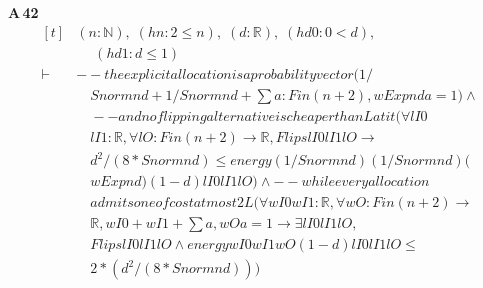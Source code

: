 \noindent\textbf{A\,42}\quad{}
{\footnotesize\[ \begin{aligned}[t]
&(\mathit{n} : \mathbb{N} ),\; (\mathit{hn} : 2 \leq \mathit{n}),\; (\mathit{d} : \mathbb{R} ),\; (\mathit{hd0} : 0 < \mathit{d}),\\
&\quad \; (\mathit{hd1} : \mathit{d} \leq 1)\\
\vdash\;&-- \mathit{the} \mathit{explicit} \mathit{allocation} \mathit{is} \mathit{a} \mathit{probability} \mathit{vector} (1/\\
&\quad \mathit{Snorm} \mathit{n} \mathit{d} + 1/\mathit{Snorm} \mathit{n} \mathit{d} + \textstyle\sum \mathit{a} : \mathit{Fin} (\mathit{n}+2), \mathit{wExp} \mathit{n} \mathit{d} \mathit{a} = 1) \wedge\\
&\quad -- \mathit{and} \mathit{no} \mathit{flipping} \mathit{alternative} \mathit{is} \mathit{cheaper} \mathit{than} \mathit{L} \mathit{at} \mathit{it} (\forall \mathit{lI0}\\
&\quad \mathit{lI1} : \mathbb{R} , \forall \mathit{lO} : \mathit{Fin} (\mathit{n}+2) \to \mathbb{R} , \mathit{Flips} \mathit{lI0} \mathit{lI1} \mathit{lO} \to\\
&\quad \mathit{d}^{2}/(8*\mathit{Snorm} \mathit{n} \mathit{d}) \leq \mathit{energy} (1/\mathit{Snorm} \mathit{n} \mathit{d}) (1/\mathit{Snorm} \mathit{n} \mathit{d}) (\\
&\quad \mathit{wExp} \mathit{n} \mathit{d}) (1-\mathit{d}) \mathit{lI0} \mathit{lI1} \mathit{lO}) \wedge -- \mathit{while} \mathit{every} \mathit{allocation}\\
&\quad \mathit{admits} \mathit{one} \mathit{of} \mathit{cost} \mathit{at} \mathit{most} 2 \mathit{L} (\forall \mathit{wI0} \mathit{wI1} : \mathbb{R} , \forall \mathit{wO} : \mathit{Fin} (\mathit{n}+2) \to\\
&\quad \mathbb{R} , \mathit{wI0} + \mathit{wI1} + \textstyle\sum \mathit{a}, \mathit{wO} \mathit{a} = 1 \to \exists \mathit{lI0} \mathit{lI1} \mathit{lO},\\
&\quad \mathit{Flips} \mathit{lI0} \mathit{lI1} \mathit{lO} \wedge \mathit{energy} \mathit{wI0} \mathit{wI1} \mathit{wO} (1-\mathit{d}) \mathit{lI0} \mathit{lI1} \mathit{lO} \leq\\
&\quad 2*(\mathit{d}^{2}/(8*\mathit{Snorm} \mathit{n} \mathit{d})))
\end{aligned} \]}


